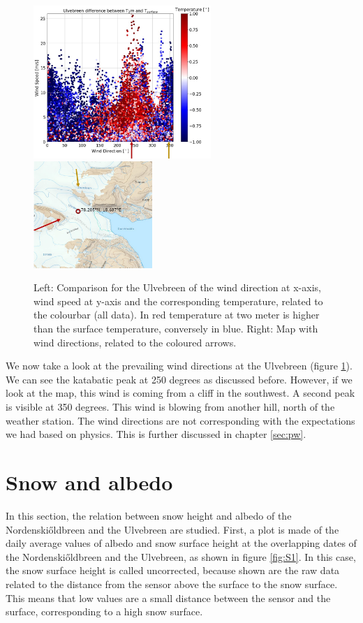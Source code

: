 \documentclass[11pt]{report}
\begin{document}
\begin{figure}[H]
\includegraphics[scale=1, width=0.6\textwidth]{norde-WS-WD.jpg}
\includegraphics[scale=1, width=0.40\textwidth]{ulve-WS-WD-rose-1.jpg}
\caption{Left: Comparison for the Ulvebreen of the wind direction at x-axis, wind speed at y-axis and the corresponding temperature, related to the colourbar (all data). In red temperature at two meter is higher than the surface temperature, conversely in blue. Right: Map \cite{NPI} with wind directions, related to the coloured arrows.}
\label{fig:PRulve}
\end{figure}

We now take a look at the prevailing wind directions at the Ulvebreen (figure \ref{fig:PRulve}). We can see the katabatic peak at 250 degrees as discussed before. However, if we look at the map, this wind is coming from a cliff in the southwest. A second peak is visible at 350 degrees. This wind is blowing from another hill, north of the weather station. The wind directions are not corresponding with the expectations we had based on physics. This is further discussed in chapter \ref{sec:pw}. \\


\section{Snow and albedo}\label{sec:rad}
In this section, the relation between snow height and albedo of the Nordenski\H{o}ldbreen and the Ulvebreen are studied. First, a plot is made of the daily average values of albedo and snow surface height at the overlapping dates of the Nordenski\H{o}ldbreen and the Ulvebreen, as shown in figure \ref{fig:S1}. In this case, the snow surface height is called uncorrected, because shown are the raw data related to the distance from the sensor above the surface to the snow surface. This means that low values are a small distance between the sensor and the surface, corresponding to a high snow surface.
\end{document}
